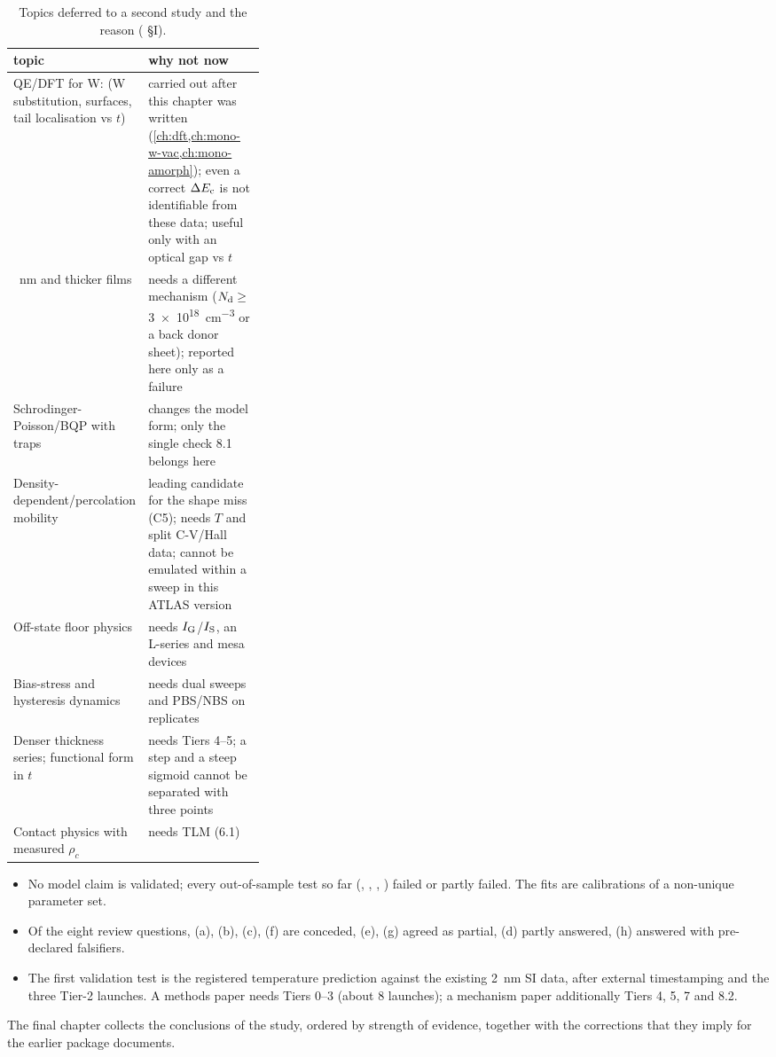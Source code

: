 \begin{table}[tbp]
  \centering
  \footnotesize
  \caption{Topics deferred to a second study and the reason ( \S I).}
  \label{tab:val-second}
  \begin{tabularx}{\linewidth}{>{\raggedright\arraybackslash}p{0.33\linewidth}>{\raggedright\arraybackslash}X}
    \toprule
    topic & why not now \\
    \midrule
    QE/DFT for W:\InO{} (W substitution, surfaces, tail localisation vs $t$) & carried out after this chapter was written (\cref{ch:dft,ch:mono-w-vac,ch:mono-amorph}); even a correct $\Delta E_{\mathrm{c}}$ is not identifiable from these data; useful only with an optical gap vs $t$ \\
    31.8~nm and thicker films & needs a different mechanism ($N_{\mathrm{d}}\ge$\SI{3e18}{cm^{-3}} or a back donor sheet); reported here only as a failure \\
    Schrodinger-Poisson/BQP with traps & changes the model form; only the single check 8.1 belongs here \\
    Density-dependent/percolation mobility & leading candidate for the shape miss (C5); needs $T$ and split C-V/Hall data; cannot be emulated within a sweep in this ATLAS version \\
    Off-state floor physics & needs $I_{\mathrm{G}}$/$I_{\mathrm{S}}$, an L-series and mesa devices \\
    Bias-stress and hysteresis dynamics & needs dual sweeps and PBS/NBS on replicates \\
    Denser thickness series; functional form in $t$ & needs Tiers 4--5; a step and a steep sigmoid cannot be separated with three points \\
    Contact physics with measured $\rho_c$ & needs TLM (6.1) \\
    \bottomrule
  \end{tabularx}
\end{table}

\begin{keyresult}[title={Key result: validation status}]
\begin{itemize}
  \item No model claim is validated; every out-of-sample test so far (, , , ) failed or partly failed. The fits are calibrations of a non-unique parameter set.
  \item Of the eight review questions, (a), (b), (c), (f) are conceded, (e), (g) agreed as partial, (d) partly answered, (h) answered with pre-declared falsifiers.
  \item The first validation test is the registered temperature prediction against the existing 2~nm SI data, after external timestamping and the three Tier-2 launches. A methods paper needs Tiers 0--3 (about 8 launches); a mechanism paper additionally Tiers 4, 5, 7 and 8.2.
\end{itemize}
\end{keyresult}

The final chapter collects the conclusions of the study, ordered by strength of evidence, together with the corrections that they imply for the earlier package documents.
